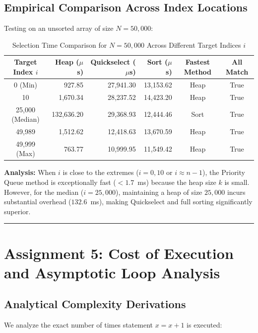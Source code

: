 \documentclass[12pt]{article}
\begin{document}
\subsection{Empirical Comparison Across Index Locations}
Testing on an unsorted array of size $N = 50,000$:

\begin{table}[H]
\centering
\caption{Selection Time Comparison for $N = 50,000$ Across Different Target Indices $i$}
\vspace{4pt}
\begin{tabular}{crrrcc}
\toprule
\textbf{Target Index $i$} & \textbf{Heap ($\mu$s)} & \textbf{Quickselect ($\mu$s)} & \textbf{Sort ($\mu$s)} & \textbf{Fastest Method} & \textbf{All Match} \\
\midrule
0 (Min)         & 927.85    & 27,941.30 & 13,153.62 & Heap & True \\
10              & 1,670.34  & 28,237.52 & 14,423.20 & Heap & True \\
25,000 (Median) & 132,636.20& 29,368.93 & 12,444.46 & Sort & True \\
49,989          & 1,512.62  & 12,418.63 & 13,670.59 & Heap & True \\
49,999 (Max)    & 763.77    & 10,999.95 & 11,549.42 & Heap & True \\
\bottomrule
\end{tabular}
\end{table}

\textbf{Analysis:} When $i$ is close to the extremes ($i=0, 10$ or $i \approx n-1$), the Priority Queue method is exceptionally fast ($< 1.7$~ms) because the heap size $k$ is small. However, for the median ($i = 25,000$), maintaining a heap of size $25,000$ incurs substantial overhead ($132.6$~ms), making Quickselect and full sorting significantly superior.

\vspace{0.3cm}
\hrule
\vspace{0.3cm}

\section{Assignment 5: Cost of Execution and Asymptotic Loop Analysis}

\subsection{Analytical Complexity Derivations}
We analyze the exact number of times statement $x = x + 1$ is executed:
\end{document}
